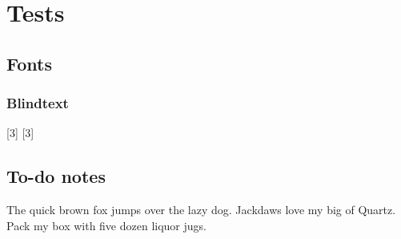 
\chapter{Tests}

\section{Fonts}

\subsection{Blindtext}
\blindtext[3]
[3]
\blindmathtrue
\blindtext
{}[3]
\blindmathpaper

\section{To-do notes}

\blindtext
{}
\blindtext
{}
\blindtext
{}
\blindtext
{}
The quick brown fox jumps over the lazy dog. Jackdaws love my big
 of Quartz. Pack my box with five dozen liquor jugs.